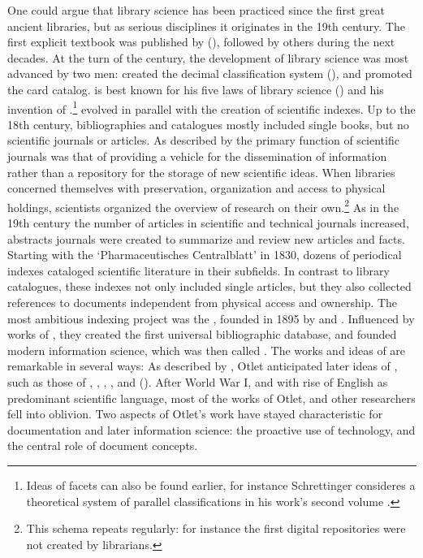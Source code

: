 One could argue that library science has been practiced since the first great
ancient libraries, but as serious disciplines it originates in the 19th
century. The first explicit  textbook was published by
 (\citeyear{Schrettinger1808}), followed by others
during the next decades.  At the turn of the century, the development of
library science was most advanced by two men:  created
the decimal classification system (\citeyear{Dewey1876}), and promoted the card
catalog.   is best known for his five
laws of library science (\citeyear{Ranganathan1931}) and his invention of
.\footnote{Ideas of facets can also be found
earlier, for instance Schrettinger consideres a theoretical system of parallel
classifications in his work's second volume \cite[p. 85]{Schrettinger1829}.}
 evolved in parallel with the creation of scientific
indexes. Up to the 18th century, bibliographies and catalogues mostly included
single books, but no scientific journals or articles. As described by
\textcite{Kronick1962} the primary function of scientific journals was that of
providing a vehicle for the dissemination of information rather than a
repository for the storage of new scientific ideas. When libraries concerned
themselves with preservation, organization and access to physical holdings,
scientists organized the overview of research on their own.\footnote{This
schema repeats regularly: for instance the first digital repositories were not
created by librarians.} As in the 19th century the number of articles in
scientific and technical journals increased, abstracts journals were created to
summarize and review new articles and facts.  Starting with the
`Pharmaceutisches Centralblatt' in 1830, dozens of periodical indexes cataloged
scientific literature in their subfields.  In contrast to library catalogues,
these indexes not only included single articles, but they also collected
references to documents independent from physical access and ownership. The
most ambitious indexing project was the , founded in 1895 by  and .  Influenced by works of , they created the
first universal bibliographic database, and founded modern information science,
which was then called  \cite{Rayward1997}. The works and
ideas of  are remarkable in several ways: As described by
\textcite{Rayward1994}, Otlet anticipated later ideas of , such as those of \textcite{Wells1938}, \textcite{Bush1945},
\textcite{Engelbart1963}, \textcite{Nelson1965,Nelson1981}, and
 (\citeyear{BernersLee1989,BernersLee2001a}). After
World War I, and with rise of English as predominant scientific language, most
of the works of Otlet,  and other researchers
fell into oblivion. Two aspects of Otlet's work have stayed
characteristic for documentation and later information science: the proactive
use of technology, and the central role of document concepts.

